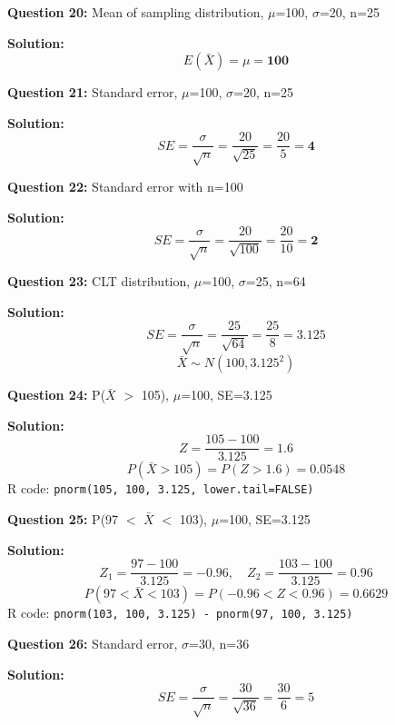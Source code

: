 \documentclass[11pt]{article}
\begin{document}
\textbf{Question 20:} Mean of sampling distribution, $\mu$=100, $\sigma$=20, n=25

\textcolor{correctgreen}{\textbf{Solution:}}
$$E(\bar{X}) = \mu = \textbf{100}$$

\vspace{0.5cm}

\textbf{Question 21:} Standard error, $\mu$=100, $\sigma$=20, n=25

\textcolor{correctgreen}{\textbf{Solution:}}
$$SE = \frac{\sigma}{\sqrt{n}} = \frac{20}{\sqrt{25}} = \frac{20}{5} = \textbf{4}$$

\vspace{0.5cm}

\textbf{Question 22:} Standard error with n=100

\textcolor{correctgreen}{\textbf{Solution:}}
$$SE = \frac{\sigma}{\sqrt{n}} = \frac{20}{\sqrt{100}} = \frac{20}{10} = \textbf{2}$$

\vspace{0.5cm}

\textbf{Question 23:} CLT distribution, $\mu$=100, $\sigma$=25, n=64

\textcolor{correctgreen}{\textbf{Solution:}}
$$SE = \frac{\sigma}{\sqrt{n}} = \frac{25}{\sqrt{64}} = \frac{25}{8} = 3.125$$
$$\bar{X} \sim N(100, 3.125^2)$$

\vspace{0.5cm}

\textbf{Question 24:} P($\bar{X}$ $>$ 105), $\mu$=100, SE=3.125

\textcolor{correctgreen}{\textbf{Solution:}}
$$Z = \frac{105 - 100}{3.125} = 1.6$$
$$P(\bar{X} > 105) = P(Z > 1.6) = 0.0548$$
R code: \texttt{pnorm(105, 100, 3.125, lower.tail=FALSE)}

\vspace{0.5cm}

\textbf{Question 25:} P(97 $<$ $\bar{X}$ $<$ 103), $\mu$=100, SE=3.125

\textcolor{correctgreen}{\textbf{Solution:}}
$$Z_1 = \frac{97-100}{3.125} = -0.96, \quad Z_2 = \frac{103-100}{3.125} = 0.96$$
$$P(97 < \bar{X} < 103) = P(-0.96 < Z < 0.96) = 0.6629$$
R code: \texttt{pnorm(103, 100, 3.125) - pnorm(97, 100, 3.125)}

\vspace{0.5cm}

\textbf{Question 26:} Standard error, $\sigma$=30, n=36

\textcolor{correctgreen}{\textbf{Solution:}}
$$SE = \frac{\sigma}{\sqrt{n}} = \frac{30}{\sqrt{36}} = \frac{30}{6} = 5$$
\end{document}
